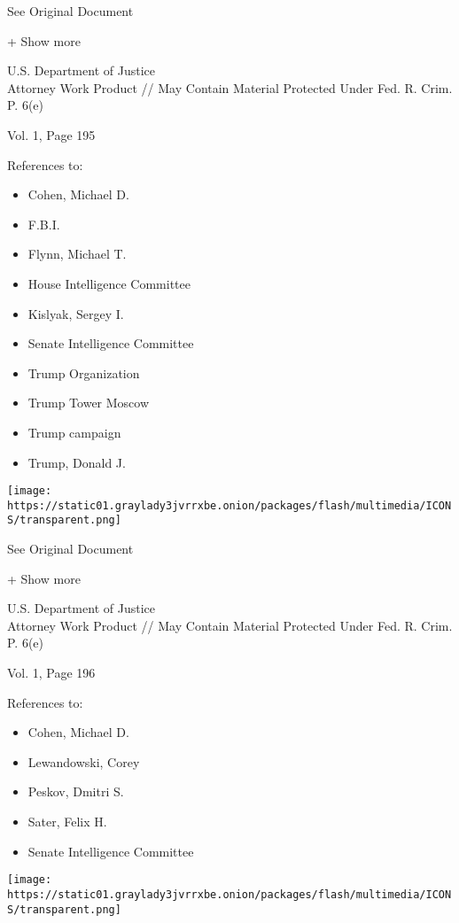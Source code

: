 See Original Document

+ Show more

U.S. Department of Justice\\
Attorney Work Product // May Contain Material Protected Under Fed. R.
Crim. P. 6(e)

Vol. 1, Page 195

References to:

\begin{itemize}
\tightlist
\item
  Cohen, Michael D.
\item
  F.B.I.
\item
  Flynn, Michael T.
\item
  House Intelligence Committee
\item
  Kislyak, Sergey I.
\item
  Senate Intelligence Committee
\item
  Trump Organization
\item
  Trump Tower Moscow
\item
  Trump campaign
\item
  Trump, Donald J.
\end{itemize}

\protect\hyperlink{}{}

\texttt{[image: https://static01.graylady3jvrrxbe.onion/packages/flash/multimedia/ICONS/transparent.png]}

See Original Document

+ Show more

U.S. Department of Justice\\
Attorney Work Product // May Contain Material Protected Under Fed. R.
Crim. P. 6(e)

Vol. 1, Page 196

References to:

\begin{itemize}
\tightlist
\item
  Cohen, Michael D.
\item
  Lewandowski, Corey
\item
  Peskov, Dmitri S.
\item
  Sater, Felix H.
\item
  Senate Intelligence Committee
\end{itemize}

\protect\hyperlink{}{}

\texttt{[image: https://static01.graylady3jvrrxbe.onion/packages/flash/multimedia/ICONS/transparent.png]}

